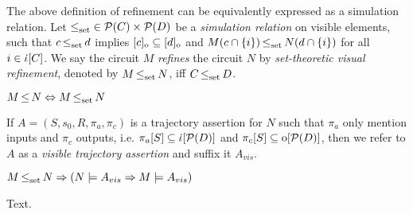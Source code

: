 The above definition of refinement can be equivalently expressed as a simulation relation. Let $\operatorname{\operatorname{\leq}_{\textrm{set}}} \in \mathcal{P}(C) \times \mathcal{P}(D)$ be a \textit{simulation relation} on visible elements, such that $c \operatorname{\operatorname{\leq}_{\textrm{set}}} d$ implies $[c]_{\mathrm{o}} \subseteq [d]_{\mathrm{o}}$ and $M(c \cap \{ i \}) \operatorname{\operatorname{\leq}_{\textrm{set}}} N(d \cap \{ i \})$ for all $i \in \dot{\iota}[C]$. We say the circuit $M$ \textit{refines} the circuit $N$ by \textit{set-theoretic visual refinement}, denoted by $M \operatorname{\operatorname{\leq}_{\textrm{set}}} N$, iff $C \operatorname{\operatorname{\leq}_{\textrm{set}}} D$. 

\begin{theorem} \label{thm:set-equals-sim}
$M \operatorname{\leq} N \Leftrightarrow M \operatorname{\operatorname{\leq}_{\textrm{set}}} N$
\end{theorem}

If $A = (S,s_{0},R,\pi_{a},\pi_{c})$ is a trajectory assertion for $N$ such that $\pi_{a}$ only mention inputs and $\pi_{c}$ outputs, i.e. $\pi_{a}[S] \subseteq \dot{\iota}[\mathcal{P}(D)]$ and $\pi_{c}[S] \subseteq \mathrm{o}[\mathcal{P}(D)]$, then we refer to $A$ as a \textit{visible trajectory assertion} and suffix it $A_{vis}$.

\begin{theorem} \label{thm:sim-refines-trans}
$M \operatorname{\operatorname{\leq}_{\textrm{set}}} N \Rightarrow (N \models A_{vis} \Rightarrow M \models A_{vis})$
\end{theorem}

Text.

